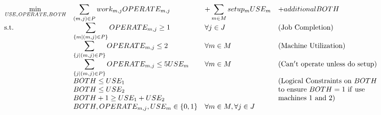 \documentclass[10pt]{article}
\begin{document}
 \[
    \begin{array}{llll}
      \displaystyle\min_{ \tiny{\it USE, OPERATE, BOTH}} & \displaystyle\sum_{(m,j)\in P} work_{m,j} OPERATE_{m,j} & + \displaystyle\sum_{m\in M} setup_m USE_m & + additional BOTH \\
      \mbox{s.t.} & \displaystyle\sum_{\{m|(m,j)\in P\}} OPERATE_{m,j} \ge 1 &  \forall j \in J & {\rm (Job~Completion)}\\
& \displaystyle\sum_{\{j|(m,j) \in P\}} OPERATE_{m,j} \le 2 &  \forall m \in M & {\rm (Machine~Utilization)}\\
& \displaystyle\sum_{\{j|(m,j) \in P\}} OPERATE_{m,j} \le 5 USE_m &  \forall m \in M & {\rm (Can't~operate~unless~do~setup)}\\
& BOTH \le USE_1 & & {\rm (Logical~Constraints~on}~BOTH\\
& BOTH \le USE_2 & & {\rm to~ensure~} BOTH=1 {\rm ~if~use}\\
& BOTH +1 \ge USE_1 + USE_2 & & {\rm machines~1~and~2)}\\
& BOTH,OPERATE_{m,j},USE_m \in \{0,1\} & \forall m\in M, \forall j\in J\\
    \end{array}
    \]

\newpage

\end{document}
